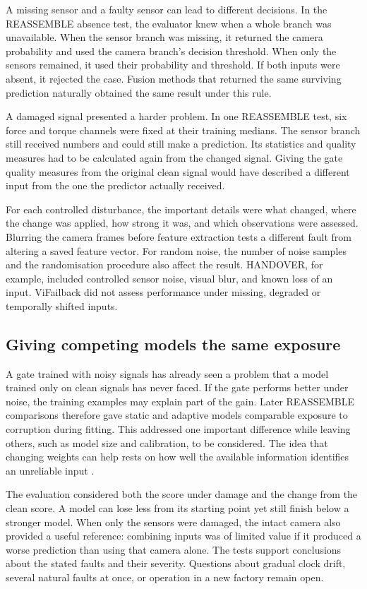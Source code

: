 A missing sensor and a faulty sensor can lead to different decisions. In the REASSEMBLE
absence test, the evaluator knew when a whole branch was unavailable. When the sensor
branch was missing, it returned the camera probability and used the camera branch’s
decision threshold. When only the sensors remained, it used their probability and
threshold. If both inputs were absent, it rejected the case. Fusion methods that
returned the same surviving prediction naturally obtained the same result under this
rule.

A damaged signal presented a harder problem. In one REASSEMBLE test, six force and
torque channels were fixed at their training medians. The sensor branch still received
numbers and could still make a prediction. Its statistics and quality measures had to be
calculated again from the changed signal. Giving the gate quality measures from the
original clean signal would have described a different input from the one the predictor
actually received.

For each controlled disturbance, the important details were what changed, where the
change was applied, how strong it was, and which observations were assessed. Blurring
the camera frames before feature extraction tests a different fault from altering a
saved feature vector. For random noise, the number of noise samples and the
randomisation procedure also affect the result. HANDOVER, for example, included
controlled sensor noise, visual blur, and known loss of an input. ViFailback did not assess performance under missing,
degraded or temporally shifted inputs.

\subsection{Giving competing models the same exposure}

A gate trained with noisy signals has already seen a problem that a model trained only
on clean signals has never faced. If the gate performs better under noise, the training
examples may explain part of the gain. Later REASSEMBLE comparisons therefore gave
static and adaptive models comparable exposure to corruption during fitting. This
addressed one important difference while leaving others, such as model size and
calibration, to be considered. The idea that changing weights can help rests on how well
the available information identifies an unreliable input \parencite{Zhang2023QMF}.

The evaluation considered both the score under damage and the change from the clean
score. A model can lose less from its starting point yet still finish below a stronger
model. When only the sensors were damaged, the intact camera also provided a useful
reference: combining inputs was of limited value if it produced a worse prediction than
using that camera alone. The tests support conclusions about the stated faults and their
severity. Questions about gradual clock drift, several natural faults at once, or
operation in a new factory remain open.

